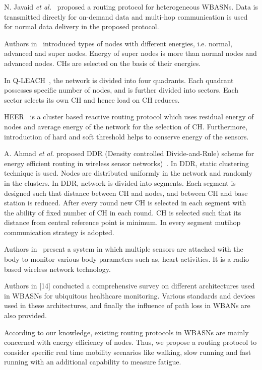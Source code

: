 \documentclass[journal]{IEEEtran}
\begin{document}
N. Javaid \textit{et al.}~\cite{8} proposed a routing protocol for heterogeneous WBASNs. Data is transmitted directly for on-demand data and multi-hop
communication is used for normal data delivery in the proposed protocol.

Authors in~\cite{9} introduced  types of nodes with different energies, i.e. normal, advanced and super nodes. Energy of super nodes is more than normal
nodes and advanced nodes. CHs are selected on the basis of their energies.

In Q-LEACH~\cite{10}, the network is divided into four quadrants. Each quadrant possesses specific number of nodes, and is further divided into sectors.
Each sector selects its own CH and hence load on CH reduces.

HEER~\cite{11} is a cluster based reactive routing protocol which uses residual energy of nodes and average energy of the network for the selection of CH.
Furthermore, introduction of hard and soft threshold helps to conserve energy of the sensors.

A. Ahmad \textit{et al.} proposed DDR (Density controlled Divide-and-Rule) scheme for energy efficient routing in wireless sensor networks)~\cite{12}. In DDR,
static clustering technique is used. Nodes are distributed uniformly in the network and randomly in the clusters. In DDR, network is divided into segments.
Each segment is designed such that distance between CH and nodes, and between CH and base station is reduced. After every round new CH is selected in each
segment with the ability of fixed number of CH in each round. CH is selected such that its distance from central reference point is minimum. In every segment
mutihop communication strategy is adopted.

Authors in~\cite{13} present a system in which multiple sensors are attached with the body to monitor various body parameters such as, heart activities.
It is a radio based wireless network technology.

Authors in [14] conducted a comprehensive survey on different architectures used in WBASNs for ubiquitous healthcare monitoring.
Various standards and devices used in these architectures, and finally the influence of path loss in WBANs are also provided.

According to our knowledge, existing routing protocols in WBASNs  are mainly concerned with energy efficiency of nodes. Thus, we propose a routing
protocol to consider specific real time mobility scenarios like walking, slow running and fast running with an additional capability to measure fatigue.
\end{document}
